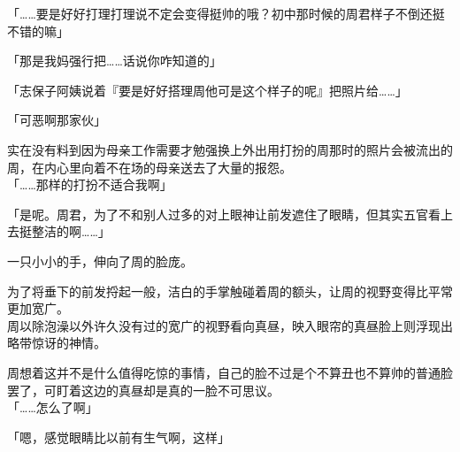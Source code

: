 「……要是好好打理打理说不定会变得挺帅的哦？初中那时候的周君样子不倒还挺不错的嘛」

「那是我妈强行把……话说你咋知道的」

「志保子阿姨说着『要是好好搭理周他可是这个样子的呢』把照片给……」

「可恶啊那家伙」

实在没有料到因为母亲工作需要才勉强换上外出用打扮的周那时的照片会被流出的周，在内心里向着不在场的母亲送去了大量的报怨。\\

「……那样的打扮不适合我啊」

「是呢。周君，为了不和别人过多的对上眼神让前发遮住了眼睛，但其实五官看上去挺整洁的啊……」

一只小小的手，伸向了周的脸庞。

为了将垂下的前发捋起一般，洁白的手掌触碰着周的额头，让周的视野变得比平常更加宽广。\\

周以除泡澡以外许久没有过的宽广的视野看向真昼，映入眼帘的真昼脸上则浮现出略带惊讶的神情。

周想着这并不是什么值得吃惊的事情，自己的脸不过是个不算丑也不算帅的普通脸罢了，可盯着这边的真昼却是真的一脸不可思议。\\

「……怎么了啊」

「嗯，感觉眼睛比以前有生气啊，这样」\\

